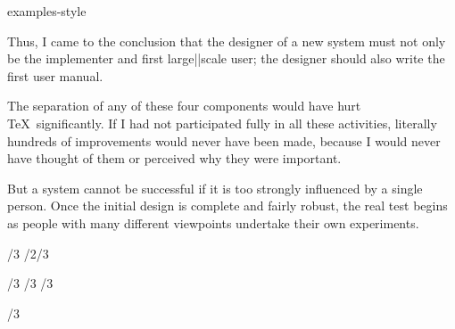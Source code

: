 \environment examples-style

\startdocument
  [title={Natural Tables},
   author={Hans Hagen}]

\startbuffer[knuth-1]
    Thus, I came to the conclusion that the designer of a new
    system must not only be the implementer and first
    large||scale user; the designer should also write the first
    user manual.
\stopbuffer

\startbuffer[knuth-2]
    The separation of any of these four components would have
    hurt \TeX\ significantly. If I had not participated fully in
    all these activities, literally hundreds of improvements
    would never have been made, because I would never have
    thought of them or perceived why they were important.
\stopbuffer

\startbuffer[knuth-3]
    But a system cannot be successful if it is too strongly
    influenced by a single person. Once the initial design is
    complete and fairly robust, the real test begins as people
    with many different viewpoints undertake their own
    experiments.
\stopbuffer


\StartExample
\bTABLE
\bTR {} \eTD {}/3     \eTD {} \eTD \eTR
\bTR                   {} \eTD {} \eTD                   \eTR
\bTR                   {} \eTD {} \eTD                   \eTR
\bTR {}/2/3                     \eTD {}       \eTD \eTR
\bTR {}       \eTD {} \eTD {} \eTD {}       \eTD \eTR
\eTABLE
\StopExample


\StartExample
\setupTABLE[1,4][2][background=color,backgroundcolor=red]
\bTABLE
\bTR {}       \eTD {} \eTD {} \eTD {}       \eTD \eTR
\bTR {} \eTD {}/3     \eTD {} \eTD \eTR
\bTR                   {}/3     \eTD                   \eTR
\bTR                   {}/3     \eTD                   \eTR
\eTABLE
\StopExample


\StartExample
\bTABLE[align={middle,lohi}]
\bTR {} \eTD {} \eTD {} \eTD            {} \eTD \eTR
\bTR {} \eTD {}/3 \eTD {} \eTD \eTR
\bTR {} \eTD                                    {} \eTD \eTR
\bTR {} \eTD {} \eTD {} \eTD            {} \eTD \eTR
\eTABLE
\StopExample


\StartExample
\hbox \bgroup \ignorespaces

